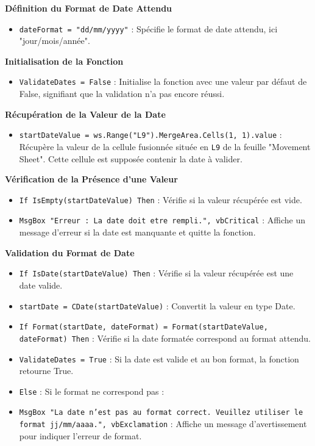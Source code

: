 \documentclass[a4paper, oneside, 12pt, final]{extreport}
\begin{document}
\textbf{Définition du Format de Date Attendu}

\begin{itemize}
    \item \texttt{dateFormat = "dd/mm/yyyy"} : Spécifie le format de date attendu, ici "jour/mois/année".
\end{itemize}

\textbf{Initialisation de la Fonction}

\begin{itemize}
    \item \texttt{ValidateDates = False} : Initialise la fonction avec une valeur par défaut de False, signifiant que la validation n'a pas encore réussi.
\end{itemize}

\textbf{Récupération de la Valeur de la Date}

\begin{itemize}
    \item \texttt{startDateValue = ws.Range("L9").MergeArea.Cells(1, 1).value} : Récupère la valeur de la cellule fusionnée située en \texttt{L9} de la feuille "Movement Sheet". Cette cellule est supposée contenir la date à valider.
\end{itemize}

\textbf{Vérification de la Présence d'une Valeur}

\begin{itemize}
    \item \texttt{If IsEmpty(startDateValue) Then} : Vérifie si la valeur récupérée est vide.
    \item \texttt{MsgBox "Erreur : La date doit etre rempli.", vbCritical} : Affiche un message d'erreur si la date est manquante et quitte la fonction.
\end{itemize}

\textbf{Validation du Format de Date}

\begin{itemize}
    \item \texttt{If IsDate(startDateValue) Then} : Vérifie si la valeur récupérée est une date valide.
    \item \texttt{startDate = CDate(startDateValue)} : Convertit la valeur en type Date.
    \item \texttt{If Format(startDate, dateFormat) = Format(startDateValue, dateFormat) Then} : Vérifie si la date formatée correspond au format attendu.
    \item \texttt{ValidateDates = True} : Si la date est valide et au bon format, la fonction retourne True.
    \item \texttt{Else} : Si le format ne correspond pas :
    \item \texttt{MsgBox "La date n'est pas au format correct. Veuillez utiliser le format jj/mm/aaaa.", vbExclamation} : Affiche un message d'avertissement pour indiquer l'erreur de format.
\end{itemize}
\end{document}
